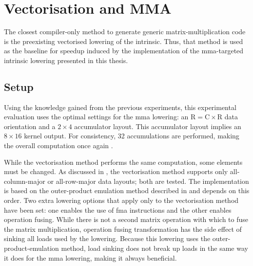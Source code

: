 \documentclass[\main/thesis.tex]{subfiles}
\begin{document}
\section{Vectorisation and MMA}
The closest compiler-only method to generate generic matrix-multiplication code is the preexisting vectorised \gls{lowering} of the  intrinsic.
Thus, that method is used as the baseline for speedup induced by the implementation of the \gls{mma}-targeted intrinsic \gls{lowering} presented in this thesis.

\subsection{Setup}
Using the knowledge gained from the previous experiments, this experimental evaluation uses the optimal settings for the \gls{mma} \gls{lowering}: an $\textrm{R} = \textrm{C} \times \textrm{R}$ data orientation and a $2 \times 4$ accumulator layout.\footnotemark
{}
This accumulator layout implies an  $8 \times 16$ kernel output.
For consistency, 32 accumulations are performed, making the overall computation once again .

While the vectorisation method performs the same computation, some elements must be changed.
As discussed in , the vectorisation method supports only all-column-major or all-row-major data layouts; both are tested.
The implementation is based on the outer-product emulation method described in  and depends on this order.
Two extra \gls{lowering} options that apply only to the vectorisation method have been set: one enables the use of \gls{fma} instructions and the other enables operation fusing.
While there is not a second matrix operation with which to fuse the matrix multiplication, operation fusing transformation has the side effect of sinking all loads used by the \gls{lowering}.
Because this \gls{lowering} uses the outer-product-emulation method, load sinking does not break up loads in the same way it does for the \gls{mma} \gls{lowering}, making it always beneficial.
\end{document}
